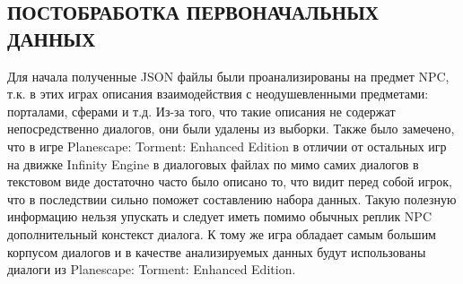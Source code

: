 \subsection{ПОСТОБРАБОТКА ПЕРВОНАЧАЛЬНЫХ ДАННЫХ}

Для начала полученные JSON файлы были проанализированы на предмет NPC, т.к. в этих играх описания взаимодействия с неодушевленными предметами: порталами, сферами и т.д. Из-за того, что такие описания не содержат непосредственно диалогов, они были удалены из выборки. Также было замечено, что в игре Planescape: Torment: Enhanced Edition в отличии от остальных игр на движке Infinity Engine в диалоговых файлах по мимо самих диалогов в текстовом виде достаточно часто было описано то, что видит перед собой игрок, что в последствии сильно поможет составлению набора данных. Такую полезную информацию нельзя упускать и следует иметь помимо обычных реплик NPC дополнительный констекст диалога. К тому же игра обладает самым большим корпусом диалогов и в качестве анализируемых данных будут использованы диалоги из Planescape: Torment: Enhanced Edition.